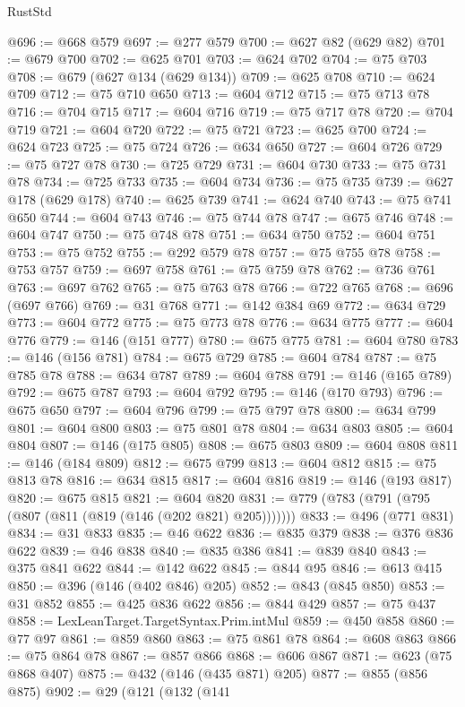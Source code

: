 \begin{lexlean}{RustStd}
\begin{coremodule}
{\begin{coremodule}
{{{{{{{{{{{{{{{{{{{{{{{{{{@696 := @668 @579
@697 := @277 @579
@700 := @627 @82 (@629 @82)
@701 := @679 @700
@702 := @625 @701
@703 := @624 @702
@704 := @75 @703
@708 := @679 (@627 @134 (@629 @134))
@709 := @625 @708
@710 := @624 @709
@712 := @75 @710 @650
@713 := @604 @712
@715 := @75 @713 @78
@716 := @704 @715
@717 := @604 @716
@719 := @75 @717 @78
@720 := @704 @719
@721 := @604 @720
@722 := @75 @721
@723 := @625 @700
@724 := @624 @723
@725 := @75 @724
@726 := @634 @650
@727 := @604 @726
@729 := @75 @727 @78
@730 := @725 @729
@731 := @604 @730
@733 := @75 @731 @78
@734 := @725 @733
@735 := @604 @734
@736 := @75 @735
@739 := @627 @178 (@629 @178)
@740 := @625 @739
@741 := @624 @740
@743 := @75 @741 @650
@744 := @604 @743
@746 := @75 @744 @78
@747 := @675 @746
@748 := @604 @747
@750 := @75 @748 @78
@751 := @634 @750
@752 := @604 @751
@753 := @75 @752
@755 := @292 @579 @78
@757 := @75 @755 @78
@758 := @753 @757
@759 := @697 @758
@761 := @75 @759 @78
@762 := @736 @761
@763 := @697 @762
@765 := @75 @763 @78
@766 := @722 @765
@768 := @696 (@697 @766)
@769 := @31 @768
@771 := @142 @384 @69
@772 := @634 @729
@773 := @604 @772
@775 := @75 @773 @78
@776 := @634 @775
@777 := @604 @776
@779 := @146 (@151 @777)
@780 := @675 @775
@781 := @604 @780
@783 := @146 (@156 @781)
@784 := @675 @729
@785 := @604 @784
@787 := @75 @785 @78
@788 := @634 @787
@789 := @604 @788
@791 := @146 (@165 @789)
@792 := @675 @787
@793 := @604 @792
@795 := @146 (@170 @793)
@796 := @675 @650
@797 := @604 @796
@799 := @75 @797 @78
@800 := @634 @799
@801 := @604 @800
@803 := @75 @801 @78
@804 := @634 @803
@805 := @604 @804
@807 := @146 (@175 @805)
@808 := @675 @803
@809 := @604 @808
@811 := @146 (@184 @809)
@812 := @675 @799
@813 := @604 @812
@815 := @75 @813 @78
@816 := @634 @815
@817 := @604 @816
@819 := @146 (@193 @817)
@820 := @675 @815
@821 := @604 @820
@831 := @779 (@783 (@791 (@795 (@807 (@811 (@819 (@146 (@202 @821) @205)))))))
@833 := @496 (@771 @831)
@834 := @31 @833
@835 := @46 @622
@836 := @835 @379
@838 := @376 @836 @622
@839 := @46 @838
@840 := @835 @386
@841 := @839 @840
@843 := @375 @841 @622
@844 := @142 @622
@845 := @844 @95
@846 := @613 @415
@850 := @396 (@146 (@402 @846) @205)
@852 := @843 (@845 @850)
@853 := @31 @852
@855 := @425 @836 @622
@856 := @844 @429
@857 := @75 @437
@858 := LexLeanTarget.TargetSyntax.Prim.intMul
@859 := @450 @858
@860 := @77 @97
@861 := @859 @860
@863 := @75 @861 @78
@864 := @608 @863
@866 := @75 @864 @78
@867 := @857 @866
@868 := @606 @867
@871 := @623 (@75 @868 @407)
@875 := @432 (@146 (@435 @871) @205)
@877 := @855 (@856 @875)
@902 := @29
    (@121
      (@132
        (@141
}}}}}}}}}}}}}}}}}}}}}}}}}}
\end{coremodule}}
\end{coremodule}
\end{lexlean}

